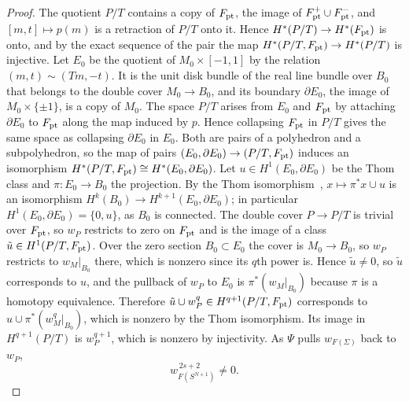 \begin{proof}
The quotient $P/T$ contains a copy of $F_{\rm pt}$, the image of $F_{\rm pt}^+\cup F_{\rm pt}^-$, and $[m,t]\mapsto p(m)$ is a retraction of $P/T$ onto it. Hence $H^*(P/T)\to H^*(F_{\rm pt})$ is onto, and by the exact sequence of the pair the map $H^*(P/T,F_{\rm pt})\to H^*(P/T)$ is injective. Let $E_0$ be the quotient of $M_0\times[-1,1]$ by the relation $(m,t)\sim(Tm,-t)$. It is the unit disk bundle of the real line bundle over $B_0$ that belongs to the double cover $M_0\to B_0$, and its boundary $\partial E_0$, the image of $M_0\times\{\pm1\}$, is a copy of $M_0$. The space $P/T$ arises from $E_0$ and $F_{\rm pt}$ by attaching $\partial E_0$ to $F_{\rm pt}$ along the map induced by $p$. Hence collapsing $F_{\rm pt}$ in $P/T$ gives the same space as collapsing $\partial E_0$ in $E_0$. Both are pairs of a polyhedron and a subpolyhedron, so the map of pairs $(E_0,\partial E_0)\to(P/T,F_{\rm pt})$ induces an isomorphism $H^*(P/T,F_{\rm pt})\cong H^*(E_0,\partial E_0)$. Let $u\in H^1(E_0,\partial E_0)$ be the Thom class and $\pi:E_0\to B_0$ the projection. By the Thom isomorphism~\cite[\S\S8, 10]{MS}, $x\mapsto\pi^*x\cup u$ is an isomorphism $H^k(B_0)\to H^{k+1}(E_0,\partial E_0)$; in particular $H^1(E_0,\partial E_0)=\{0,u\}$, as $B_0$ is connected. The double cover $P\to P/T$ is trivial over $F_{\rm pt}$, so $w_P$ restricts to zero on $F_{\rm pt}$ and is the image of a class $\tilde u\in H^1(P/T,F_{\rm pt})$. Over the zero section $B_0\subset E_0$ the cover is $M_0\to B_0$, so $w_P$ restricts to $w_M|_{B_0}$ there, which is nonzero since its $q$th power is. Hence $\tilde u\ne0$, so $\tilde u$ corresponds to $u$, and the pullback of $w_P$ to $E_0$ is $\pi^*(w_M|_{B_0})$ because $\pi$ is a homotopy equivalence. Therefore $\tilde u\cup w_P^q\in H^{q+1}(P/T,F_{\rm pt})$ corresponds to $u\cup\pi^*(w_M^q|_{B_0})$, which is nonzero by the Thom isomorphism. Its image in $H^{q+1}(P/T)$ is $w_P^{q+1}$, which is nonzero by injectivity. As $\Psi$ pulls $w_{F(\Sigma)}$ back to $w_P$,
\begin{equation}\label{eq:even-power}
 w_{F(S^{N+1})}^{\,2s+2}\ne0 .
\end{equation}


\end{proof}

